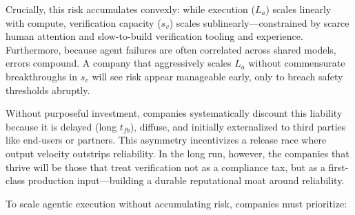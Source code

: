 \documentclass[12pt, letter]{article}
\begin{document}
Crucially, this risk accumulates convexly: while execution ($L_a$) scales linearly with compute, verification capacity ($s_v$) scales sublinearly—constrained by scarce human attention and slow-to-build verification tooling and experience. Furthermore, because agent failures are often correlated across shared models, errors compound. A company that aggressively scales $L_a$ without commensurate breakthroughs in $s_v$ will see risk appear manageable early, only to breach safety thresholds abruptly.

Without purposeful investment, companies systematically discount this liability because it is delayed (long $t_{fb}$), diffuse, and initially externalized to third parties like end-users or partners. This asymmetry incentivizes a release race where output velocity outstrips reliability. In the long run, however, the companies that thrive will be those that treat verification not as a compliance tax, but as a first-class production input—building a durable reputational moat around reliability.

To scale agentic execution without accumulating risk, companies must prioritize:
\end{document}
